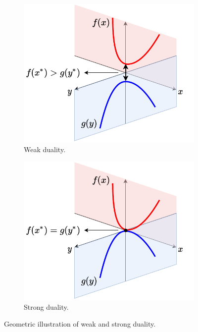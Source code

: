 \begin{figure}[t] 
    \begin{subfigure}{.48\textwidth}
      \centering
      \includegraphics[width=\linewidth]{./figures/weak_dual.pdf}
      \captionsetup{justification=centering}
      \caption{Weak duality.}
    \end{subfigure}
    \hfill
    \begin{subfigure}{.48\textwidth}
      \centering
      \includegraphics[width=\linewidth]{./figures/strong_dual.pdf}
      \captionsetup{justification=centering}
      \caption{Strong duality.}
    \end{subfigure}
    \captionsetup{justification=centering}
    \caption{Geometric illustration of weak and strong duality.}
    \label{fig:duality}
\end{figure}

